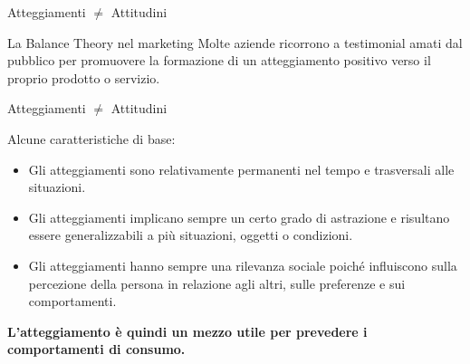 \documentclass{beamer}
\begin{document}
\begin{frame}{Atteggiamenti $\neq$ Attitudini}
    \begin{block}{La Balance Theory nel marketing}
        Molte aziende ricorrono a testimonial amati dal pubblico per promuovere la formazione di un atteggiamento positivo verso il proprio prodotto o servizio.  \\
        \vspace{0.5em}
        \centering
        \pause
    \end{block}
\end{frame}

\begin{frame}{Atteggiamenti $\neq$ Attitudini}
    \begin{block}{Alcune caratteristiche di base:}
        \small
        \begin{itemize}
            \item Gli atteggiamenti sono relativamente permanenti nel tempo e trasversali alle situazioni.
            \item Gli atteggiamenti implicano sempre un certo grado di astrazione e risultano essere generalizzabili a più situazioni, oggetti o condizioni.
            \item Gli atteggiamenti hanno sempre una rilevanza sociale poiché influiscono sulla percezione della persona in relazione agli altri, sulle preferenze e sui comportamenti.
        \end{itemize}
        \textbf{L’atteggiamento è quindi un mezzo utile per prevedere i comportamenti di consumo.}
    \end{block}
\end{frame}

\end{document}
